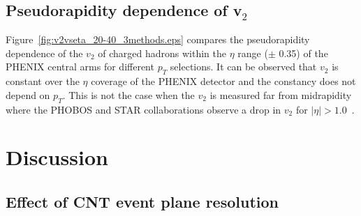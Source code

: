 \documentclass[aps,prc,superscriptaddress,showpacs,floatfix,twocolumn]{revtex4}
\newcommand \pt{\mbox{$p_T$}\xspace}
\begin{document}
\subsection{Pseudorapidity dependence of v$_2$}

Figure~\ref{fig:v2vseta_20-40_3methods.eps} compares the 
pseudorapidity dependence of the $v_2$ of charged hadrons within 
the $\eta$ range ($\pm$ 0.35) of the PHENIX central arms for 
different \pt selections. It can be observed that $v_2$ is 
constant over the $\eta$ coverage of the PHENIX detector and the 
constancy does not depend on \pt.  This is not the case when the 
$v_2$ is measured far from midrapidity where the PHOBOS and STAR 
collaborations observe a drop in $v_2$ for $|\eta| > 
1.0$~\cite{Adams:2004bi,Alver:2006wh}.

\section{Discussion\label{sec:discussions}}

\subsection{Effect of CNT event plane resolution}
\end{document}
